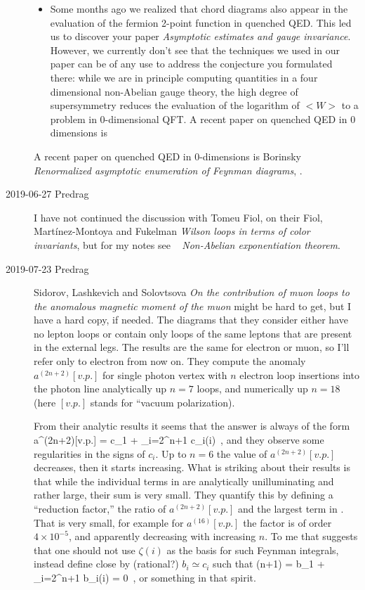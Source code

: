 \begin{description}
\begin{itemize}
  \item
Some months ago we realized that chord diagrams also appear in the
evaluation of the fermion 2-point function in quenched QED. This led us
to discover your paper {\em Asymptotic estimates and gauge
invariance}.
However, we currently don't see that the techniques we used in our paper
can be of any use to address the conjecture you formulated there: while
we are in principle computing quantities in a four dimensional
non-Abelian gauge theory, the high degree of supersymmetry reduces the
evaluation of the logarithm of $<W>$ to a problem in 0-dimensional QFT. A
recent paper on quenched QED in 0 dimensions is
\end{itemize}
A recent paper on quenched QED in 0-dimensions is
Borinsky
{\em Renormalized asymptotic enumeration of {Feynman} diagrams},
.

\item[2019-06-27 Predrag]
I have not continued the discussion with Tomeu Fiol, on their Fiol,
Martínez-Montoya and Fukelman {\em Wilson loops in terms of
color invariants}, but for my notes see ~{\em
Non-Abelian exponentiation theorem}.

\item[2019-07-23 Predrag]
Sidorov, Lashkevich and Solovtsova {\em On the contribution
of muon loops to the anomalous magnetic moment of the muon} might be
{hard to get}, but I have a hard copy, if needed.
The diagrams that they consider either have no lepton
loops or contain only loops of the same leptons that are present in the
external legs.
The results are the same
for electron or muon, so I'll refer only to electron from now on.
They compute the anomaly $a^{(2n+2)}[v.p.]$ for single photon vertex with
$n$ electron loop insertions into the photon line analytically up $n=7$
loops, and numerically up $n=18$ (here $[v.p.]$ stands for ``vacuum
polarization).

From their analytic results it seems that the answer is always of the form
\beq
a^{(2n+2)}[v.p.] = c_1 + \sum_{i=2}^{n+1} c_i\zeta(i)
\,,
and they observe some regularities in the signs of $c_i$. Up to $n=6$ the
value of $a^{(2n+2)}[v.p.]$ decreases, then it starts increasing.
What is striking about their results is that while the individual terms
in  are analytically unilluminating and rather
large, their sum is very small. They quantify this by defining a
``reduction factor,'' the ratio of $a^{(2n+2)}[v.p.]$ and the largest
term in . That is very small, for example for
$a^{(16)}[v.p.]$  the factor is of order $4\times 10^{-5}$, and
apparently decreasing with increasing $n$. To me that suggests that one
should not use $\zeta(i)$ as the basis for such Feynman integrals,
instead define close by (rational?)  $b_i\simeq c_i$ such that
\beq
\hat{\zeta}(n+1) = b_1 + \sum_{i=2}^{n+1} b_i\zeta(i) = 0
\,,
or something in that spirit.


\end{description}
